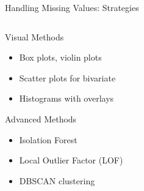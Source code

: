 \documentclass[8pt,aspectratio=1610]{beamer}
\begin{document}
\begin{frame}{Handling Missing Values: Strategies}
\begin{columns}[t]
\begin{column}{0.48\textwidth}
\begin{block}{Visual Methods}
\begin{itemize}
\setlength{\itemsep}{1pt}
\item Box plots, violin plots
\item Scatter plots for bivariate
\item Histograms with overlays
\end{itemize}
\end{block}

\begin{block}{Advanced Methods}
\begin{itemize}
\setlength{\itemsep}{1pt}
\item Isolation Forest
\item Local Outlier Factor (LOF)
\item DBSCAN clustering
\end{itemize}
\end{block}
\end{column}
\end{columns}
\end{frame}
\end{document}
